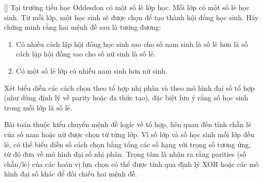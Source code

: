 \documentclass[../09-contruction-methods.tex]{subfiles}
\begin{document}
\begin{exercise*}\label{example:GBR-2015-MO-P2}[\textbf{}]
	Tại trường tiểu học Oddesdon có một số lẻ lớp học. Mỗi lớp có một số lẻ học sinh. Từ mỗi lớp, một học sinh sẽ được chọn để tạo thành hội đồng học sinh.
	Hãy chứng minh rằng hai mệnh đề sau là tương đương:
    \begin{enumerate}[topsep=0pt, partopsep=0pt, itemsep=0pt]
        \item Có nhiều cách lập hội đồng học sinh sao cho số nam sinh là số lẻ hơn là số cách lập hội đồng sao cho số nữ sinh là số lẻ.
        \item Có một số lẻ lớp có nhiều nam sinh hơn nữ sinh.
    \end{enumerate}
\end{exercise*}

\begin{remark*}
	Xét biểu diễn các cách chọn theo tổ hợp nhị phân và theo mô hình đại số tổ hợp (như dùng định lý về parity hoặc đa thức tạo),
    đặc biệt lưu ý rằng số học sinh trong mỗi lớp là số lẻ.
\end{remark*}

\begin{story*}
	Bài toán thuộc kiểu chuyển mệnh đề logic về tổ hợp, liên quan đến tính chẵn lẻ của số nam hoặc nữ được chọn từ từng lớp.
    Vì số lớp và số học sinh mỗi lớp đều lẻ, có thể biểu diễn số cách chọn bằng tổng các số hạng với trọng số tương ứng, từ đó đưa về mô hình đại số nhị phân.
    Trọng tâm là nhận ra rằng parities (số chẵn/lẻ) của các hoán vị lựa chọn có thể được tính qua định lý XOR hoặc các mô hình đại số khác để đối chiếu hai mệnh đề.
\end{story*}
\end{document}
